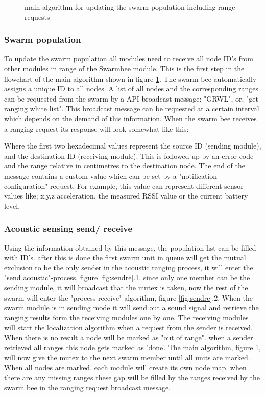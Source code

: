 \documentclass[10pt,a4paper]{article}
\begin{document}
\begin{figure}[H]
   \caption{main algorithm for updating the swarm population including range requests}
   \label{fig:mainal}
\end{figure}

\subsubsection{Swarm population}
To update the swarm population all modules need to receive all node ID's from other modules in range of the Swarmbee module. This is the first step in the flowchart of the main algorithm shown in figure  \ref{fig:mainal}. The swarm bee automatically assigns a unique ID to all nodes. A list of all nodes and the corresponding ranges can be requested from the swarm by a API broadcast message: "GRWL", or, "get ranging white list". This broadcast message can be requested at a certain interval which depends on the demand of this information. When the swarm bee receives a ranging request its response will look somewhat like this:



Where the first two hexadecimal values represent the source ID (sending module), and the destination ID (receiving module). This is followed up by an error code and the range relative in centimetres to the destination node. The end of the message contains a custom value which can be set by a "notification configuration"-request. For example, this value can represent different sensor values like; x,y,z acceleration, the measured RSSI value or the current battery level.

\subsubsection{Acoustic sensing send/ receive}
Using the information obtained by this message, the population list can be filled with ID's. after this is done the first swarm unit in queue will get the mutual exclusion to be the only sender in the acoustic ranging process, it will enter the "send acoustic"-process, figure \ref{fig:sendre}.1. since only one member can be the sending module, it will broadcast that the mutex is taken, now the rest of the swarm will enter the "process receive" algorithm, figure \ref{fig:sendre}.2. 
When the swarm module is in sending mode it will send out a sound signal and retrieve the ranging results form the receiving modules one by one. The receiving modules will start the localization algorithm when a request from the sender is received. When there is no result a node will be marked as "out of range". when a sender retrieved all ranges this node gets marked as 'done'. The main algorithm, figure \ref{fig:mainal}, will now give the mutex to the next swarm member until all units are marked. When all nodes are marked, each module will create its own node map. when there are any missing ranges these gap will be filled by the ranges received by the swarm bee in the ranging request broadcast message.
\end{document}
